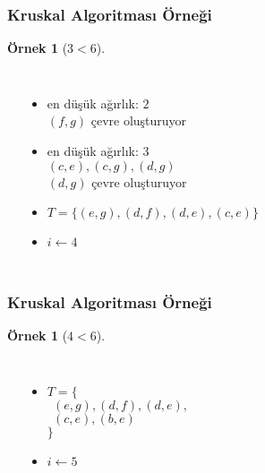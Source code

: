 \documentclass[dvipsnames]{beamer}
\theoremstyle{definition}
\theoremstyle{example}
\newtheorem{ornek}[theorem]{Örnek}
\theoremstyle{plain}
\begin{document}
\begin{frame}
  \frametitle{Kruskal Algoritması Örneği}

  \begin{ornek}[$3 < 6$]
    \begin{columns}
      \begin{center}
      \end{center}

      \pause
      \begin{itemize}
        \item en düşük ağırlık: $2$\\
          $(f,g)$ çevre oluşturuyor

        \pause
        \item en düşük ağırlık: $3$\\
          $(c,e), (c,g), (d,g)$\\
          $(d,g)$ çevre oluşturuyor

        \pause
        \item $T = \{ (e,g), (d,f), (d,e), (c,e) \}$
        \item $i \leftarrow 4$
      \end{itemize}
    \end{columns}
  \end{ornek}
\end{frame}

\begin{frame}
  \frametitle{Kruskal Algoritması Örneği}

  \begin{ornek}[$4 < 6$]
    \begin{columns}
      \begin{center}
      \end{center}

      \pause
      \begin{itemize}
        \item $T = \{$\\
          $~~(e,g), (d,f), (d,e),$\\
          $~~(c,e), (b,e)$\\
          $\}$
        \item $i \leftarrow 5$
      \end{itemize}
    \end{columns}
  \end{ornek}
\end{frame}
\end{document}
